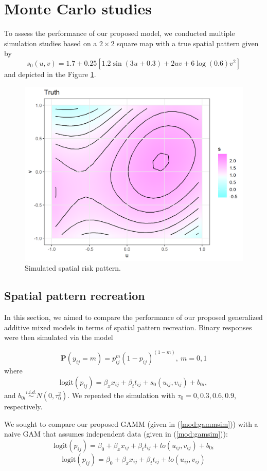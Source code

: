 	\section{Monte Carlo studies}
	To assess the performance of our proposed model, we conducted multiple simulation studies based on a $2\times 2$ square map with a true spatial pattern given by
	\begin{equation}\label{eq:nlsim}
	s_0(u,v) =1.7+0.25[1.2\sin(3u+0.3)+2uv+ 6\log(0.6)v^2]
	\end{equation}
	and depicted in the Figure \ref{f:trueSpatial}. 
	
	\begin{figure}[h]
		\centering
		\includegraphics[width=0.4\linewidth]{Figures/Chap5/Paper3_true.png}
		\caption{Simulated spatial risk pattern.}
		\label{f:trueSpatial}
	\end{figure}
	
	\subsection{Spatial pattern recreation}
	In this section, we aimed to compare the performance of our proposed generalized additive mixed models in terms of spatial pattern recreation. Binary responses were then simulated via the model
	
	\begin{equation}\label{eq:simSP1}
	\mathbf{P}(y_{ij}=m) = p_{ij}^m(1-p_{ij})^{(1-m)},\ m=0,1
	\end{equation}
	where 
	\begin{equation}\label{eq:simSP2}
	\text{logit}(p_{ij}) = \beta_x x_{ij} + \beta_t t_{ij} + s_0(u_{ij},v_{ij}) + b_{0i} ,
	\end{equation}
	and $b_{0i} \stackrel{i.i.d.}{\sim} N(0,\tau_0^2)$. We repeated the simulation with $\tau_0=0,0.3,0.6,0.9$, respectively. 
	
	We sought to compare our proposed GAMM (given in (\ref{mod:gammsim})) with a naive GAM that assumes independent data (given in (\ref{mod:gamsim})):
	\begin{equation}\label{mod:gammsim}
	\text{logit}(p_{ij}) = \beta_0 +\beta_x x_{ij}+ \beta_t t_{ij} + lo(u_{ij},v_{ij}) + b_{0i} 
	\end{equation}
	\begin{equation}\label{mod:gamsim}
	\text{logit}(p_{ij}) = \beta_0 + \beta_x x_{ij}+ \beta_t t_{ij} + lo(u_{ij},v_{ij})
	\end{equation}
	
